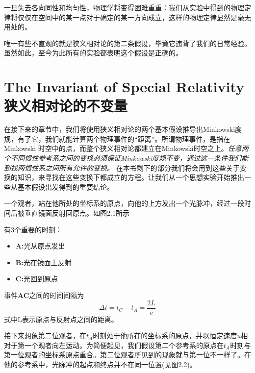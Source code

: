 一旦失去各向同性和均匀性，物理学将变得困难重重：我们从实验中得到的物理定律将仅仅在空间中的某一点对于确定的某一方向成立，这样的物理定律显然是毫无用处的。

唯一有些不直观的就是狭义相对论的第二条假设，毕竟它违背了我们的日常经验。虽然如此，至今为此所有的实验都表明这个假设是正确的。


\section[狭义相对论的不变量]{The Invariant of Special Relativity 狭义相对论的不变量}
\label{sec2.1}
在接下来的章节中，我们将使用狭义相对论的两个基本假设推导出Minkowski度规，有了它，我们就能计算两个物理事件的“距离”。所谓物理事件，是指在Minkowski 时空中的点，而整个狭义相对论都建立在Minkowski时空之上。{\it{任意两个不同惯性参考系之间的变换必须保证Minkowski度规不变，通过这一条件我们能到找两惯性系之间所有允许的变换。}}
在本书剩下的部分我们将会用到这些关于变换的知识，来寻找在这些变换下都成立的方程。让我们从一个思想实验开始推出一些从基本假设出发得到的重要结论。

{}

一个观者，站在他所处的坐标系的原点，向他的上方发出一个光脉冲，经过一段时间后被垂直镜面反射回原点。如图2.1所示

有3个重要的时刻：
\begin{itemize}
	\item {\bf{A:}}光从原点发出
	\item {\bf{B:}}光在镜面上反射
	\item {\bf{C:}}光回到原点
\end{itemize}
事件{\bf{AC}}之间的时间间隔为
\begin{equation}\label{eq2.1}
\Delta t=t_C-t_A=\frac{2L}{c}
\end{equation}
式中L表示原点与反射点之间的距离。

{}

接下来想象第二位观者，在$t_A$时刻处于他所在的坐标系的原点，并以恒定速度$u$相对于第一个观者向左运动。为简便起见，我们假设第二个参考系的原点在$t_A$时刻与第一位观者的坐标系原点重合。第二位观者所见到的现象就与第一位不一样了。在他的参考系中，光脉冲的起点和终点并不在同一位置(见图2.2)。




